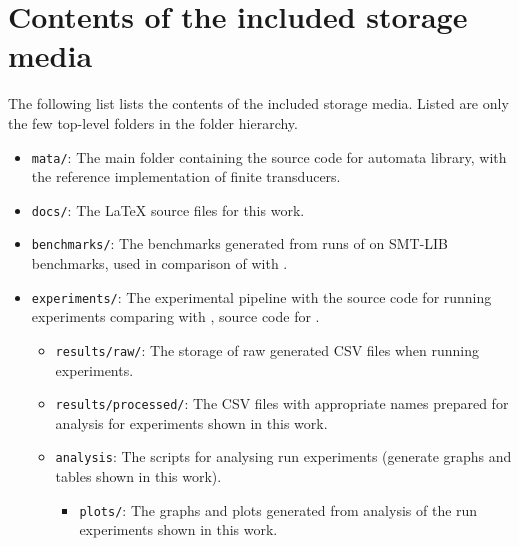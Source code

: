 
%

\chapter{Contents of the included storage media}

The following list lists the contents of the included storage media. Listed are
only the few top-level folders in the folder hierarchy.

\begin{itemize}
	\item \texttt{mata/}: The main folder containing the source code for \mata automata library, with the reference implementation of finite transducers.
    \item \texttt{docs/}: The LaTeX source files for this work.
    \item \texttt{benchmarks/}: The benchmarks generated from runs of \noodler on SMT-LIB benchmarks, used in comparison of \mata with \mona.
    \item \texttt{experiments/}: The experimental pipeline with the source code for running experiments comparing \mata with \mona, source code for \mona.
    \begin{itemize}
        \item \texttt{results/raw/}: The storage of raw generated CSV files when running experiments.

        \item \texttt{results/processed/}: The CSV files with appropriate names prepared for analysis for experiments shown in this work.

        \item \texttt{analysis}: The scripts for analysing run experiments (generate graphs and tables shown in this work).
        \begin{itemize}
          \item \texttt{plots/}: The graphs and plots generated from analysis of the run experiments shown in this work.
        \end{itemize}
    \end{itemize}
\end{itemize}

